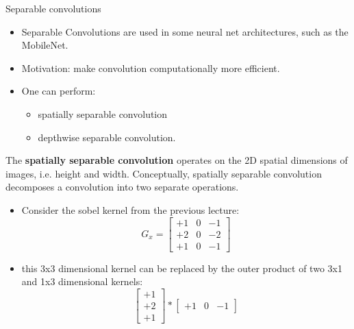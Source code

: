  \begin{vbframe}{Separable convolutions}
     \begin{itemize}
         \item Separable Convolutions are used in some neural net architectures, such as the MobileNet.
         \item Motivation: make convolution computationally more efficient.
         \item One can perform:
               \begin{itemize}
                   \item spatially separable convolution 
                   \item depthwise separable convolution.
                \end{itemize}
      \end{itemize}
      The \textbf{spatially separable convolution} operates on the 2D spatial dimensions of images, i.e. height and width. Conceptually, spatially separable convolution decomposes a convolution into two separate operations.
      \begin{itemize}   
         \item Consider the sobel kernel from the previous lecture:
             \begin{equation*}
                     G_x = 
                     \begin{bmatrix}
                         +1 & 0 & -1 \\
                         +2 & 0 & -2 \\
                         +1 & 0 & -1 
                     \end{bmatrix}
             \end{equation*}
         \item this 3x3 dimensional kernel can be replaced by the outer product of two 3x1 and 1x3 dimensional kernels:
            \begin{equation*}
                     \begin{bmatrix}
                         +1 \\ 
                         +2 \\
                         +1   
                     \end{bmatrix}* 
                     \begin{bmatrix}
                         +1 & 0 & -1   
                     \end{bmatrix}
             \end{equation*}

\end{itemize}
\end{vbframe}

